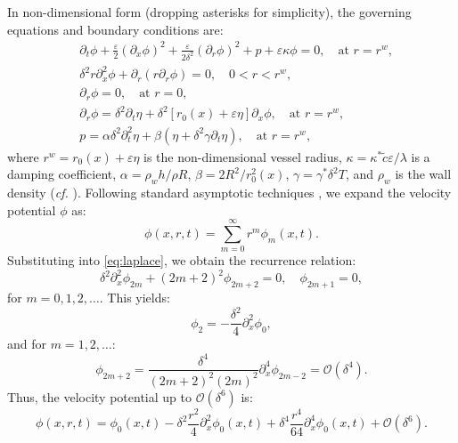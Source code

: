 \documentclass[alpha-refs, 12pt]{wiley-article}
\renewcommand{\O}{\mathcal{O}}
\newcommand{\eps}{\varepsilon}
\begin{document}
In non-dimensional form (dropping asterisks for simplicity), the governing equations and boundary conditions are:
\begin{align}
& \partial_t \phi + \frac{\eps}{2} (\partial_x \phi)^2 + \frac{\eps}{2 \delta^2} (\partial_r \phi)^2 + p + \eps \kappa \phi = 0, \quad \text{at } r = r^w, \label{eq:bernoulli} \\
& \delta^2 r \partial_x^2 \phi + \partial_r (r \partial_r \phi) = 0, \quad 0 < r < r^w, \label{eq:laplace} \\
& \partial_r \phi = 0, \quad \text{at } r = 0, \label{eq:center_bc} \\
& \partial_r \phi = \delta^2 \partial_t \eta + \delta^2 [r_0(x) + \eps \eta] \partial_x \phi, \quad \text{at } r = r^w, \label{eq:wall_bc} \\
& p = \alpha \delta^2 \partial_t^2 \eta + \beta (\eta + \delta^2 \gamma \partial_t \eta), \quad \text{at } r = r^w, \label{eq:pressure}
\end{align}
where $r^w = r_0(x) + \eps \eta$ is the non-dimensional vessel radius, $\kappa = \kappa^* \tilde{c} \eps / \lambda$ is a damping coefficient, $\alpha = \rho_w h / \rho R$, $\beta = 2 R^2 / r_0^2(x)$, $\gamma = \gamma^* \delta^2 T$, and $\rho_w$ is the wall density (\emph{cf.} \cite{Mitsotakis2019}). Following standard asymptotic techniques \cite{BCS}, we expand the velocity potential $\phi$ as:
\begin{equation}\label{eq:potential}
  \phi(x, r, t) = \sum_{m=0}^\infty r^m \phi_m(x, t).
\end{equation}
Substituting into \eqref{eq:laplace}, we obtain the recurrence relation:
\begin{equation}\label{eq:recurr}
  \delta^2 \partial_x^2 \phi_{2m} + (2m + 2)^2 \phi_{2m+2} = 0, \quad \phi_{2m+1} = 0,
\end{equation}
for $m = 0, 1, 2, \dots$. This yields:
\begin{equation}\label{eq:phi2}
  \phi_2 = -\frac{\delta^2}{4} \partial_x^2 \phi_0,
\end{equation}
and for $m = 1, 2, \dots$:
\begin{equation}\label{eq:phim}
  \phi_{2m+2} = \frac{\delta^4}{(2m + 2)^2 (2m)^2} \partial_x^4 \phi_{2m-2} = \O(\delta^4).
\end{equation}
  Thus, the velocity potential up to $\O(\delta^6)$ is:
\begin{equation}\label{eq:potapr}
  \phi(x, r, t) = \phi_0(x, t) - \delta^2 \frac{r^2}{4} \partial_x^2 \phi_0(x, t) + \delta^4 \frac{r^4}{64} \partial_x^4 \phi_0(x, t) + \O(\delta^6).
\end{equation}
\end{document}
